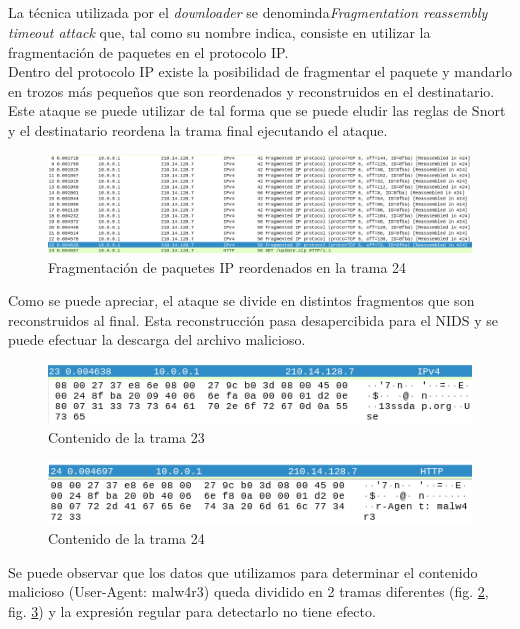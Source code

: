 \documentclass[10pt,a4paper]{article}
\begin{document}
\subsection{}
La técnica utilizada por el \textit{downloader} se denominda\textit{Fragmentation reassembly timeout attack} que, tal como su nombre indica, consiste en utilizar la fragmentación de paquetes en el protocolo IP.\\
Dentro del protocolo IP existe la posibilidad de fragmentar el paquete y mandarlo en trozos más pequeños que son reordenados y reconstruidos en el destinatario. Este ataque se puede utilizar de tal forma que se puede eludir las reglas de Snort y el destinatario reordena la trama final ejecutando el ataque.
\begin{figure}[htpb]
  \centering
  \includegraphics[width=1\textwidth]{3_1.png}
  \caption{Fragmentación de paquetes IP reordenados en la trama 24}
  \label{fig:pcap6}
\end{figure}
Como se puede apreciar, el ataque se divide en distintos fragmentos que son reconstruidos al final. Esta reconstrucción pasa desapercibida para el NIDS y se puede efectuar la descarga del archivo malicioso.
\begin{figure}[htpb]
  \centering
  \includegraphics[width=1\textwidth]{3_2_2.png}
  \caption{Contenido de la trama 23}
  \label{fig:pcap6_2}
\end{figure}

\begin{figure}[htpb]
  \centering
  \includegraphics[width=1\textwidth]{3_2_3.png}
  \caption{Contenido de la trama 24}
  \label{fig:pcap6_3}
\end{figure}

Se puede observar que los datos que utilizamos para determinar el contenido malicioso (User-Agent: malw4r3) queda dividido en 2 tramas diferentes (fig. \ref{fig:pcap6_2},  fig. \ref{fig:pcap6_3}) y la expresión regular para detectarlo no tiene efecto.
\end{document}
